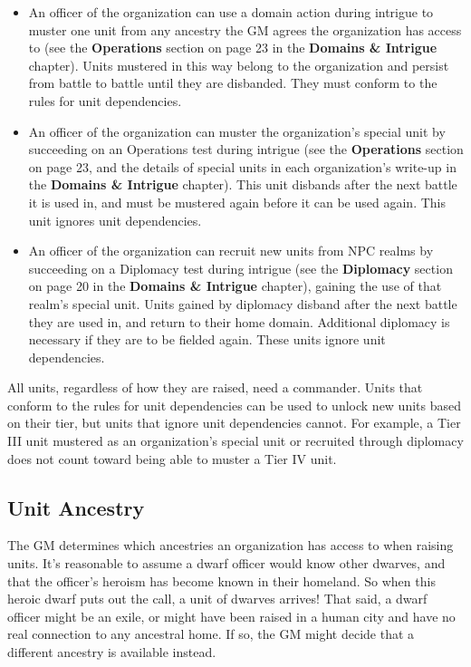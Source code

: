 \documentclass[10pt,a4paper,twoside,bg=print,twocolumn,openany,nodeprecatedcode]{dndbook}
\begin{document}
\begin{itemize}
\item An officer of the organization can use a domain action during intrigue to muster one unit from any ancestry the GM agrees the organization has access to (see the \textbf{Operations} section on page 23 in the \textbf{Domains \& Intrigue} chapter). Units mustered in this way belong to the organization and persist from battle to battle until they are disbanded. They must conform to the rules for unit dependencies.
\item An officer of the organization can muster the organization's special unit by succeeding on an Operations test during intrigue (see the \textbf{Operations} section on page 23, and the details of special units in each organization's write-up in the \textbf{Domains \& Intrigue} chapter). This unit disbands after the next battle it is used in, and must be mustered again before it can be used again. This unit ignores unit dependencies.
\item An officer of the organization can recruit new units from NPC realms by succeeding on a Diplomacy test during intrigue (see the \textbf{Diplomacy} section on page 20 in the \textbf{Domains \& Intrigue} chapter), gaining the use of that realm's special unit. Units gained by diplomacy disband after the next battle they are used in, and return to their home domain. Additional diplomacy is necessary if they are to be fielded again. These units ignore unit dependencies.
\end{itemize}

All units, regardless of how they are raised, need a commander. Units that conform to the rules for unit dependencies can be used to unlock new units based on their tier, but units that ignore unit dependencies cannot. For example, a Tier III unit mustered as an organization's special unit or recruited through diplomacy does not count toward being able to muster a Tier IV unit.

\subsection{Unit Ancestry}
The GM determines which ancestries an organization has access to when raising units. It's reasonable to assume a dwarf officer would know other dwarves, and that the officer's heroism has become known in their homeland. So when this heroic dwarf puts out the call, a unit of dwarves arrives! That said, a dwarf officer might be an exile, or might have been raised in a human city and have no real connection to any ancestral home. If so, the GM might decide that a different ancestry is available instead.
\end{document}
